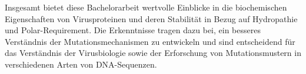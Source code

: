 \documentclass[german,version-2022-01]{uzl-thesis}
\begin{document}
Insgesamt bietet diese Bachelorarbeit wertvolle Einblicke in die biochemischen Eigenschaften von Virusproteinen und deren Stabilit\"at in Bezug auf Hydropathie und Polar-Requirement. Die Erkenntnisse tragen dazu bei, ein besseres Verst\"andnis der Mutationsmechanismen zu entwickeln und sind entscheidend f\"ur das Verst\"andnis der Virusbiologie sowie der Erforschung von Mutationsmustern in verschiedenen Arten von DNA-Sequenzen.




%
\end{document}

